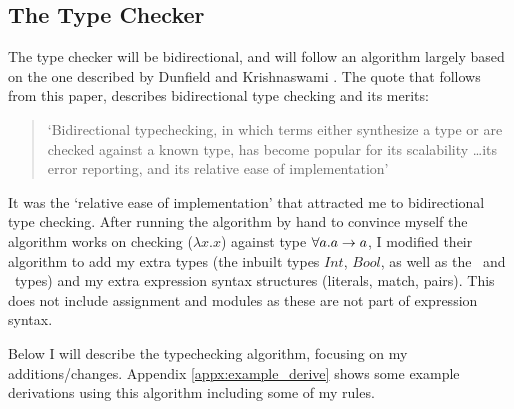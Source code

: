 \subsection{The Type Checker}
The type checker will be bidirectional, and will follow an algorithm largely based on the one described by Dunfield and Krishnaswami \cite{completebidir}. The quote that follows from this paper, describes bidirectional type checking and its merits: 
\begin{quote}
`Bidirectional typechecking, in which terms either synthesize a type or are checked against a known type, has become popular for its scalability \ldots its error reporting, and its relative ease of implementation' \cite{completebidir}
\end{quote}
\noindent It was the `relative ease of implementation' that attracted me to bidirectional type checking. After running the algorithm by hand to convince myself the algorithm works on checking ($\lambda x. x$)  against type $\forall a.a\rightarrow a$, I modified their algorithm to add my extra types (the inbuilt types $Int$, $Bool$, as well as the \Uniontype\ and \Producttype\ types) and my extra expression syntax structures (literals, match, pairs). This does not include assignment and modules as these are not part of expression syntax. 




\noindent Below I will describe the typechecking algorithm, focusing on my additions/changes. Appendix \ref{appx:example_derive} shows some example derivations using this algorithm including some of my rules. 

